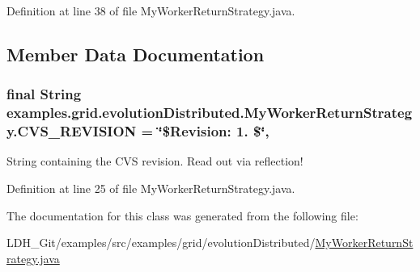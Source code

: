 Definition at line 38 of file My\-Worker\-Return\-Strategy.\-java.



\subsection{Member Data Documentation}
\hypertarget{classexamples_1_1grid_1_1evolution_distributed_1_1_my_worker_return_strategy_a3d8d87b9696fe2b7007c6ff055f3820d}{
\subsubsection[{C\-V\-S\-\_\-\-R\-E\-V\-I\-S\-I\-O\-N}]{\setlength{\rightskip}{0pt plus 5cm}final String examples.\-grid.\-evolution\-Distributed.\-My\-Worker\-Return\-Strategy.\-C\-V\-S\-\_\-\-R\-E\-V\-I\-S\-I\-O\-N = \char`\"{}\$Revision\-: 1. \$\char`\"{}\hspace{0.3cm}{\ttfamily [static]}, {\ttfamily [private]}}}\label{classexamples_1_1grid_1_1evolution_distributed_1_1_my_worker_return_strategy_a3d8d87b9696fe2b7007c6ff055f3820d}
String containing the C\-V\-S revision. Read out via reflection! 

Definition at line 25 of file My\-Worker\-Return\-Strategy.\-java.



The documentation for this class was generated from the following file\-:\begin{DoxyCompactItemize}
\item 
L\-D\-H\-\_\-\-Git/examples/src/examples/grid/evolution\-Distributed/\hyperlink{evolution_distributed_2_my_worker_return_strategy_8java}{My\-Worker\-Return\-Strategy.\-java}\end{DoxyCompactItemize}
